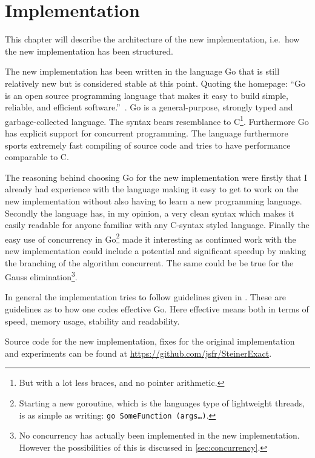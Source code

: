  {
\abnormalparskip{0pt}
\chapter{Implementation}
\label{cha:implementation}
}

This chapter will describe the architecture of the new implementation, i.e.\ how
the new implementation has been structured.

The new implementation has been written in the language Go that is still
relatively new but is considered stable at this point. Quoting the homepage:
``Go is an open source programming language that makes it easy to build simple,
reliable, and efficient software.''~\cite{golanghomepage}. Go is a
general-purpose, strongly typed and garbage-collected language. The syntax bears
resemblance to C\footnote{But with a lot less braces, and no pointer
  arithmetic.}. Furthermore Go has explicit support for concurrent programming.
The language furthermore sports extremely fast compiling of source code and
tries to have performance comparable to C.

The reasoning behind choosing Go for the new implementation were firstly that I
already had experience with the language making it easy to get to work on the
new implementation without also having to learn a new programming language.
Secondly the language has, in my opinion, a very clean syntax which makes it
easily readable for anyone familiar with any C-syntax styled language. Finally
the easy use of concurrency in Go\footnote{Starting a new goroutine, which is
  the languages type of lightweight threads, is as simple as writing:
  \texttt{go~SomeFunction~(args\ldots)}.} made it interesting as continued work
with the new implementation could include a potential and significant speedup by
making the branching of the algorithm concurrent. The same could be be true for
the Gauss elimination\footnote{No concurrency has actually been implemented in
  the new implementation. However the possibilities of this is discussed in
  \cref{sec:concurrency}.}.

In general the implementation tries to follow guidelines given in
\textcite{effectivego}. These are guidelines as to how one codes effective
Go. Here effective means both in terms of speed, memory usage, stability and
readability.

Source code for the new implementation, fixes for the original implementation and
experiments can be found at \url{https://github.com/jsfr/SteinerExact}.

